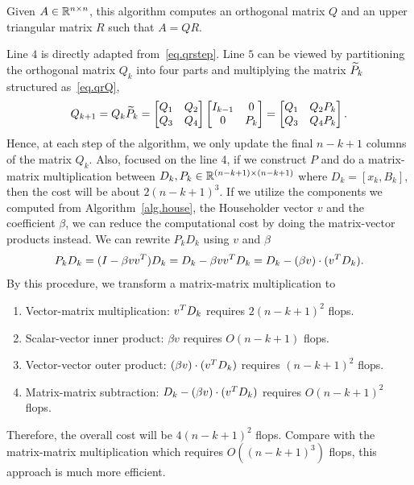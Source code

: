 \begin{algorithm}[ht]
\caption{Given $A\in\mathbb{R}^{n\times n}$, this algorithm computes an orthogonal matrix $Q$ and an upper triangular matrix $R$ such that $A = QR$.} \label{alg:householderQR}
\begin{algorithmic}[1]
         
    \EndFor
\end{algorithmic}
\end{algorithm}

Line $4$ is directly adapted from~\eqref{eq.qrstep}. Line $5$ can be viewed by partitioning the orthogonal matrix $Q_k$ into four parts and multiplying the matrix $\widetilde P_k$ structured as~\eqref{eq.qrQ},
\begin{equation}\label{eq:update-Q}
    Q_{k+1} = Q_k\widetilde P_k = 
    \begin{bmatrix}
        Q_1 & Q_2 \\
        Q_3 & Q_4
    \end{bmatrix}
    \begin{bmatrix}
        I_{k-1} & 0 \\
        0 & P_k
    \end{bmatrix} = 
    \begin{bmatrix}
        Q_1 & Q_2 P_k \\
        Q_3 & Q_4 P_k
    \end{bmatrix}.
\end{equation}
Hence, at each step of the algorithm, we only update the final $n-k+1$ columns of the matrix $Q_k$. Also, focused on the line 4, if we construct $P$ and do a matrix-matrix multiplication between $D_k,P_k\in\mathbb{R}^{(n-k+1)\times (n-k+1)}$ where $D_k = [x_k,B_k]$, then the cost will be about $2(n-k+1)^3$. If we utilize the components we computed from Algorithm~\ref{alg.house}, the Householder vector $v$ and the coefficient $\beta$, we can reduce the computational cost by doing the matrix-vector products instead. We can rewrite $P_k D_k$ using $v$ and $\beta$
\begin{equation}\notag
    P_k D_k = (I - \beta vv^T) D_k = D_k - \beta v v^T D_k = D_k - (\beta v)\cdot(v^T D_k).
\end{equation}
By this procedure, we transform a matrix-matrix multiplication to
\begin{enumerate}
    \item Vector-matrix multiplication: $v^T D_k$ requires $2(n-k+1)^2$ flops.
    \item Scalar-vector inner product: $\beta v$ requires $O(n-k+1)$ flops.
    \item Vector-vector outer product: $(\beta v)\cdot (v^T D_k)$ requires $(n-k+1)^2$ flops.
    \item Matrix-matrix subtraction: $D_k - (\beta v)\cdot(v^T D_k)$ requires $O(n-k+1)^2$ flops.
\end{enumerate}
Therefore, the overall cost will be $4(n-k+1)^2$ flops. Compare with the matrix-matrix multiplication which requires $O((n-k+1)^3)$ flops, this approach is much more efficient.

